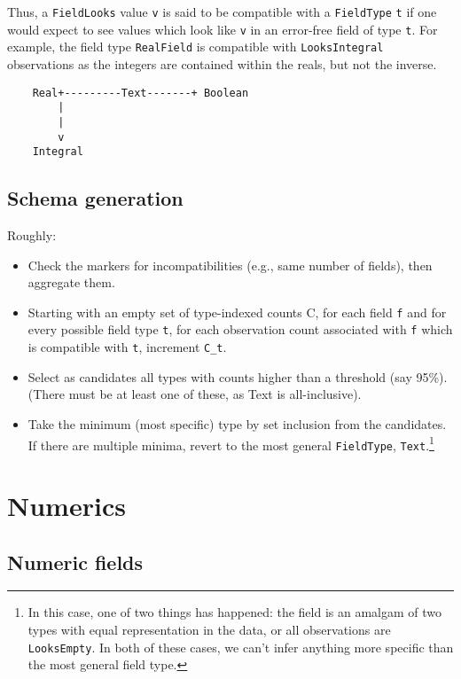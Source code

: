 \documentclass[a4paper]{article}
\begin{document}
Thus, a \texttt{FieldLooks} value \texttt{v} is said to be compatible
with a \texttt{FieldType} \texttt{t} if one would expect to see values
which look like \texttt{v} in an error-free field of type \texttt{t}.
For example, the field type \texttt{RealField} is compatible with
\texttt{LooksIntegral} observations as the integers are contained within
the reals, but not the inverse.

\begin{verbatim}
    Real+---------Text-------+ Boolean
        |
        |
        v
    Integral
\end{verbatim}

\subsection{Schema generation}\label{schema-generation}

Roughly:

\begin{itemize}
\item
  Check the markers for incompatibilities (e.g., same number of fields),
  then aggregate them.
\item
  Starting with an empty set of type-indexed counts C, for each field
  \texttt{f} and for every possible field type \texttt{t}, for each
  observation count associated with \texttt{f} which is compatible with
  \texttt{t}, increment \texttt{C\_t}.
\item
  Select as candidates all types with counts higher than a threshold
  (say 95\%). (There must be at least one of these, as Text is
  all-inclusive).
\item
  Take the minimum (most specific) type by set inclusion from the
  candidates. If there are multiple minima, revert to the most general
  \texttt{FieldType}, \texttt{Text}.\footnote{In this case, one of two
    things has happened: the field is an amalgam of two types with
    equal representation in the data, or all observations are
    \texttt{LooksEmpty}. In both of these cases, we can't infer
    anything more specific than the most general field type.}
\end{itemize}

\section{Numerics}\label{numerics}

\subsection{Numeric fields}\label{numeric-fields}
\end{document}
